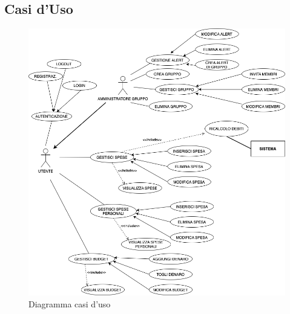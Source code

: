 \subsection{Casi d'Uso}

    \begin{figure}[h]
        \centering
        \includegraphics[scale=0.4]{images/DiagrammaCasiDusoV1.png}
        \caption{Diagramma casi d'uso }
    \end{figure}

